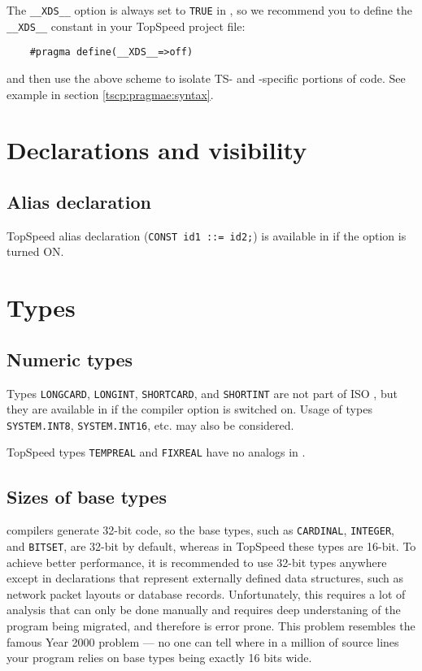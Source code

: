 The \verb'__XDS__' option is always set to \verb'TRUE' in \XDS{} \mt{}, so
we recommend you to define the \verb'__XDS__' constant in your TopSpeed project
file:

\verb'    #pragma define(__XDS__=>off)'

and then use the above scheme to isolate TS- and \XDS{}-specific portions of
code. See example in section \ref{tscp:pragmae:syntax}.


\section{Declarations and visibility}

\subsection{Alias declaration}

    TopSpeed alias declaration (\verb'CONST id1 ::= id2;') is available in
    \XDS{} if the option  is turned ON.

\section{Types}

\subsection{Numeric types}

    Types \verb'LONGCARD', \verb'LONGINT', \verb'SHORTCARD', and 
    \verb'SHORTINT' are not part of ISO \mt{}, but they are available
    in \xds{} \mt{} if the  compiler option is switched on.
    Usage of types \verb'SYSTEM.INT8', \verb'SYSTEM.INT16', etc. may 
    also be considered.

    TopSpeed \mt{} types \verb'TEMPREAL' and \verb'FIXREAL' have no analogs
    in \xds{}.

\subsection{Sizes of base types}

    \xds{} compilers generate 32-bit code, so the base \mt{}
    types, such as \verb'CARDINAL', \verb'INTEGER', and \verb'BITSET',
    are 32-bit by default, whereas in TopSpeed \mt{} these types are 16-bit.
    To achieve better performance, it is recommended to use 32-bit types 
    anywhere except in declarations that represent externally defined 
    data structures, such as network packet layouts or database records. 
    Unfortunately, this requires a lot of analysis that can only be done
    manually and requires deep understaning of the program being migrated,
    and therefore is error prone. This problem resembles the famous Year 2000 
    problem --- no one can tell where in a million of source lines your 
    program relies on base types being exactly 16 bits wide.

